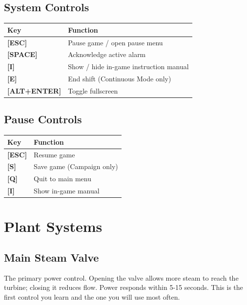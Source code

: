 \documentclass[10pt,a5paper]{article}
\newcommand{\key}[1]{\textbf{[#1]}}
\begin{document}
\subsection{System Controls}

\begin{center}
\begin{tabular}{ll}
\toprule
\textbf{Key} & \textbf{Function} \\
\midrule
\key{ESC}       & Pause game / open pause menu \\
\key{SPACE}     & Acknowledge active alarm \\
\key{I}         & Show / hide in-game instruction manual \\
\key{E}         & End shift (Continuous Mode only) \\
\key{ALT+ENTER} & Toggle fullscreen \\
\bottomrule
\end{tabular}
\end{center}

\subsection{Pause Controls}

\begin{center}
\begin{tabular}{ll}
\toprule
\textbf{Key} & \textbf{Function} \\
\midrule
\key{ESC} & Resume game \\
\key{S}   & Save game (Campaign only) \\
\key{Q}   & Quit to main menu \\
\key{I}   & Show in-game manual \\
\bottomrule
\end{tabular}
\end{center}

\section{Plant Systems}

\subsection{Main Steam Valve}

The primary power control. Opening the valve allows more steam to reach the
turbine; closing it reduces flow. Power responds within 5-15 seconds. This is
the first control you learn and the one you will use most often.
\end{document}
